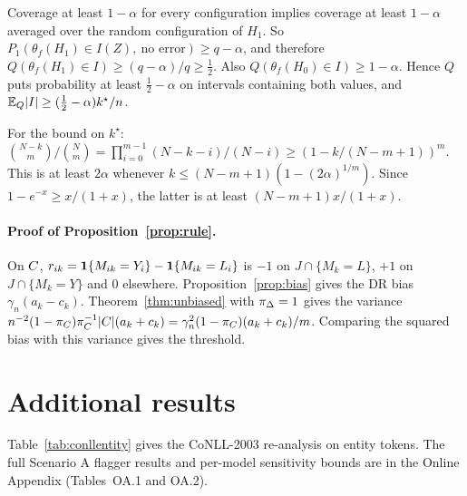 Coverage at least $1-\alpha$ for every configuration implies coverage at least $1-\alpha$ averaged over the random configuration of $H_1$. So $P_1(\theta_f(H_1)\in I(Z),\ \text{no error})\ge q-\alpha$, and therefore $Q(\theta_f(H_1)\in I)\ge(q-\alpha)/q\ge\frac12$. Also $Q(\theta_f(H_0)\in I)\ge1-\alpha$. Hence $Q$ puts probability at least $\frac12-\alpha$ on intervals containing both values, and $\mathbb{E}_Q|I|\ge(\frac12-\alpha)k^\star/n$.

For the bound on $k^\star$: $\binom{N-k}{m}/\binom Nm=\prod_{i=0}^{m-1}(N-k-i)/(N-i)\ge(1-k/(N-m+1))^m$. This is at least $2\alpha$ whenever $k\le(N-m+1)(1-(2\alpha)^{1/m})$. Since $1-e^{-x}\ge x/(1+x)$, the latter is at least $(N-m+1)x/(1+x)$. \hfill\BlackBox

\paragraph{Proof of Proposition~\ref{prop:rule}.} On $C$, $r_{ik}=\mathbf{1}\{M_{ik}=Y_i\}-\mathbf{1}\{M_{ik}=L_i\}$ is $-1$ on $J\cap\{M_k=L\}$, $+1$ on $J\cap\{M_k=Y\}$ and $0$ elsewhere. Proposition~\ref{prop:bias} gives the DR bias $\gamma_n(a_k-c_k)$. Theorem~\ref{thm:unbiased} with $\pi_\Delta=1$ gives the variance $n^{-2}(1-\pi_C)\pi_C^{-1}|C|(a_k+c_k)=\gamma_n^2(1-\pi_C)(a_k+c_k)/m$. Comparing the squared bias with this variance gives the threshold. \hfill\BlackBox

\section{Additional results}

Table~\ref{tab:conllentity} gives the CoNLL-2003 re-analysis on entity tokens. The full Scenario A flagger results and per-model sensitivity bounds are in the Online Appendix (Tables~OA.1 and OA.2).

\begin{table}[H]
\centering
\scriptsize

\caption{CoNLL-2003 re-analysis restricted to the \cnEnt{} tokens whose original or reference label is an entity (Section~\ref{sec:emp-conll}). Columns as in Table~\ref{tab:conll}.}
\label{tab:conllentity}
\end{table}
